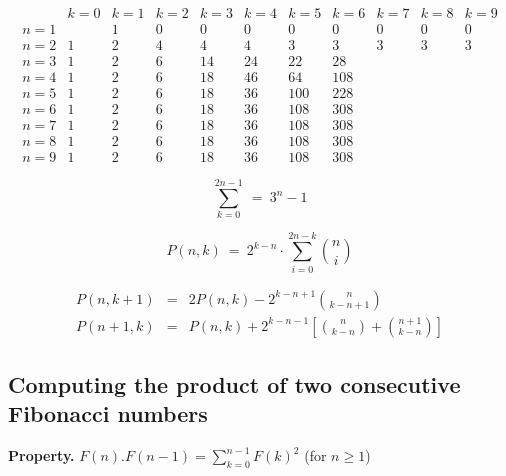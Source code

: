 \begin{equation}
\label{eq:TP-table}
\begin{array}{l|rrrrrrrrrr}
    & k=0 & k=1 & k=2 & k=3  & k=4 & k=5  & k=6 & k=7 & k=8 & k=9 \\
\hline
n=1 &     &  1  &  0  &   0  &  0  &    0 &   0 &  0  &  0  &  0  \\
n=2 &  1  &  2  &  4  &   4  &  4  &    3 &   3 &  3  &  3  &  3  \\
n=3 &  1  &  2  &  6  &  14  & 24  &   22 &  28 &     &     &     \\
n=4 &  1  &  2  &  6  &  18  & 46  &   64 & 108 &     &     &     \\
n=5 &  1  &  2  &  6  &  18  & 36  &  100 & 228 &     &     &     \\
n=6 &  1  &  2  &  6  &  18  & 36  &  108 & 308 &     &     &     \\
n=7 &  1  &  2  &  6  &  18  & 36  &  108 & 308 &     &     &     \\
n=8 &  1  &  2  &  6  &  18  & 36  &  108 & 308 &     &     &     \\
n=9 &  1  &  2  &  6  &  18  & 36  &  108 & 308 &     &     & 
\end{array}
\end{equation}





\[ \sum_{k=0}^{2n-1} \ = \ 3^n -1 \]

\[ P(n,k) \ = \ 2^{k-n} \cdot \sum_{i=0}^{2n-k} {n \choose i} \]


\begin{eqnarray*}
P(n, k+1) & = & 
  2 P(n,k) - 2^{k-n+1} {n \choose {k-n+1}} \\
P(n+1, k) & = &
  P(n,k) + 2^{k-n-1} \left[ {n \choose {k-n}} + {{n+1} \choose {k-n}} \right]
\end{eqnarray*}



 


\subsection{Computing the product of two consecutive Fibonacci numbers}

\noindent \textbf{Property.} 
\label{prop:FiboSumConsecutive}
$F(n).F(n-1)= \sum_{k=0}^{n-1} F(k)^2$ (for $n \geq 1$)

